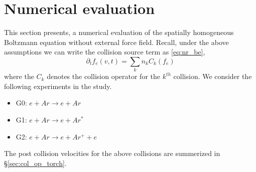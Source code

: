 %






\newpage
\section{Numerical evaluation}
This section presents, a numerical evaluation of the spatially homogeneous Boltzmann equation without external force field. Recall, under the above assumptions we can write the collision source term as \eqref{eq:nr_be}, 
\begin{equation}
\partial_t f_e(v,t) = \sum_{k} n_k C_k(f_e) \label{eq:nr_be}
\end{equation} where the $C_k$ denotes the collision operator for the $k^{th}$ collision. We consider the following experiments in the study. 
\begin{itemize}
	\item G0: $e + Ar \rightarrow e + Ar $ 
	\item G1: $e + Ar \rightarrow e + Ar^*$
	\item G2: $e + Ar \rightarrow e + Ar^+ + e$ 
\end{itemize} The post collision velocities for the above collisions are summerized in \S\ref{sec:col_op_torch}.


